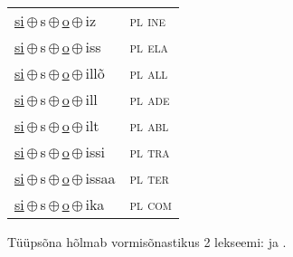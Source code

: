 \begin{minipage}{\textwidth}
\begin{sideways}
\begin{tabular}{l l}
\underline{si}\,$\oplus$\,s\,$\oplus$\,\underline{o}\,$\oplus$\,iz & \textsc{ pl ine } \\
\underline{si}\,$\oplus$\,s\,$\oplus$\,\underline{o}\,$\oplus$\,iss & \textsc{ pl ela } \\
\underline{si}\,$\oplus$\,s\,$\oplus$\,\underline{o}\,$\oplus$\,illõ & \textsc{ pl all } \\
\underline{si}\,$\oplus$\,s\,$\oplus$\,\underline{o}\,$\oplus$\,ill & \textsc{ pl ade } \\
\underline{si}\,$\oplus$\,s\,$\oplus$\,\underline{o}\,$\oplus$\,ilt & \textsc{ pl abl } \\
\underline{si}\,$\oplus$\,s\,$\oplus$\,\underline{o}\,$\oplus$\,issi & \textsc{ pl tra } \\
\underline{si}\,$\oplus$\,s\,$\oplus$\,\underline{o}\,$\oplus$\,issaa & \textsc{ pl ter } \\
\underline{si}\,$\oplus$\,s\,$\oplus$\,\underline{o}\,$\oplus$\,ika & \textsc{ pl com } \\
\end{tabular}
\end{sideways}
\label{tab:tüüpsõnamall-siso}

\end{minipage}

 
\vspace{1em}
\noindent Tüüpsõna hõlmab vormisõnastikus 2 lekseemi:  ja .
